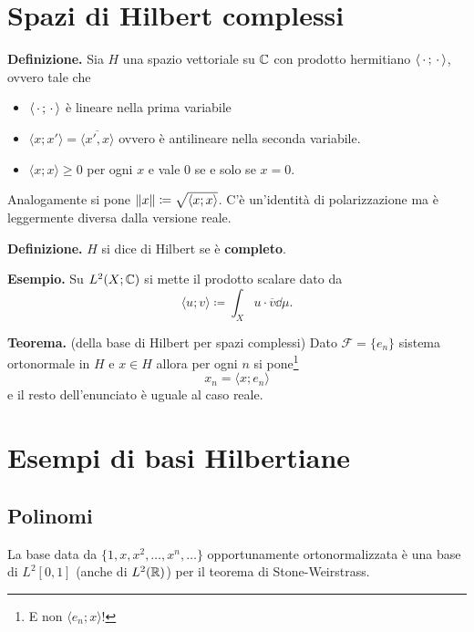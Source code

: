 \section{Spazi di Hilbert complessi}

\textbf{Definizione.}
Sia $H$ una spazio vettoriale su $\mathbb C$ con prodotto hermitiano $\langle\,\cdot\,; \,\cdot\,\rangle$, ovvero tale che
\begin{itemize}
	\item $\langle \,\cdot\,; \,\cdot\, \rangle$ è lineare nella prima variabile
	\item $\langle x; x' \rangle = \overline{\langle x', x \rangle}$ ovvero è antilineare nella seconda variabile.
	\item $\langle x; x \rangle \geq 0$ per ogni $x$ e vale $0$ se e solo se $x = 0$.
\end{itemize}

Analogamente si pone $\left\lVert x \right\rVert \coloneqq \sqrt{\langle x; x \rangle}$. C'è un'identità di polarizzazione ma è leggermente diversa dalla versione reale.

\textbf{Definizione.} $H$ si dice di Hilbert se è \textbf{completo}.

\textbf{Esempio.}
Su $L^2(X; \mathbb C)$ si mette il prodotto scalare dato da
$$
\langle u; v \rangle \coloneqq \int_X u \cdot \overline v \dd \mu.
$$

\textbf{Teorema.} (della base di Hilbert per spazi complessi)
Dato $\mathcal F = \{ e_n \}$ sistema ortonormale in $H$ e $x \in H$ allora per ogni $n$ si pone\footnote{E non $\langle e_n; x \rangle$!}
$$
x_n = \langle x; e_n \rangle
$$
e il resto dell'enunciato è uguale al caso reale.


\section{Esempi di basi Hilbertiane}

\subsection{Polinomi}

La base data da $ \{ 1, x, x^2, \dots, x^n, \dots \} $ opportunamente ortonormalizzata è una base di $L^2[0, 1]$ (anche di $L^2(\mathbb R)$) per il teorema di Stone-Weirstrass.


